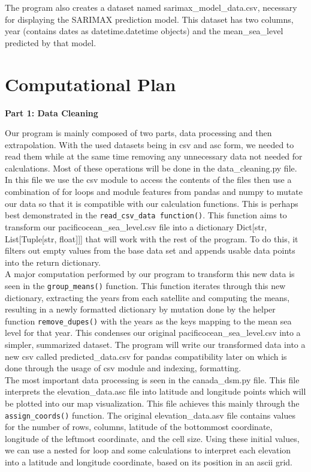\documentclass[fontsize=11pt]{article}
\begin{document}
    The program also creates a dataset named sarimax\_model\_data.csv, necessary for displaying the SARIMAX prediction model. This dataset has two columns, year (contains dates as datetime.datetime objects) and the mean\_sea\_level predicted by that model.


    \section*{Computational Plan}
    \textbf{Part 1: Data Cleaning}

    \hspace{\parindent}Our program is mainly composed of two parts, data processing and then extrapolation. With the used datasets being in csv and asc form, we needed to read them while at the same time removing any unnecessary data not needed for calculations. Most of these operations will be done in the data\_cleaning.py file. In this file we use the csv module to access the contents of the files then use a combination of for loops and module features from pandas and numpy to mutate our data so that it is compatible with our calculation functions. This is perhaps best demonstrated in the \texttt{read\_csv\_data function()}. This function aims to transform our pacificocean\_sea\_level.csv file into a dictionary Dict[str, List[Tuple[str, float]]] that will work with the rest of the program. To do this, it filters out empty values from the base data set and appends usable data points into the return dictionary. \\

    A major computation performed by our program to transform this new data is seen in the \texttt{group\_means()} function. This function iterates through this new dictionary, extracting the years from each satellite and computing the means, resulting in a newly formatted dictionary by mutation done by the helper function \texttt{remove\_dupes()} with the years as the keys mapping to the mean sea level for that year. This condenses our original pacificocean\_sea\_level.csv into a simpler, summarized dataset. The program will write our transformed data into a new csv called predicted\_data.csv for pandas compatibility later on which is done through the usage of csv module and indexing, formatting. \\

    The most important data processing is seen in the canada\_dsm.py file. This file interprets the elevation\_data.asc file into latitude and longitude points which will be plotted into our map visualization. This file achieves this mainly through the \texttt{assign\_coords()} function. The original elevation\_data.asv file contains values for the number of rows, columns, latitude of the bottommost coordinate, longitude of the leftmost coordinate, and the cell size. Using these initial values, we can use a nested for loop and some calculations to interpret each elevation into a latitude and longitude coordinate, based on its position in an ascii grid.
\end{document}
